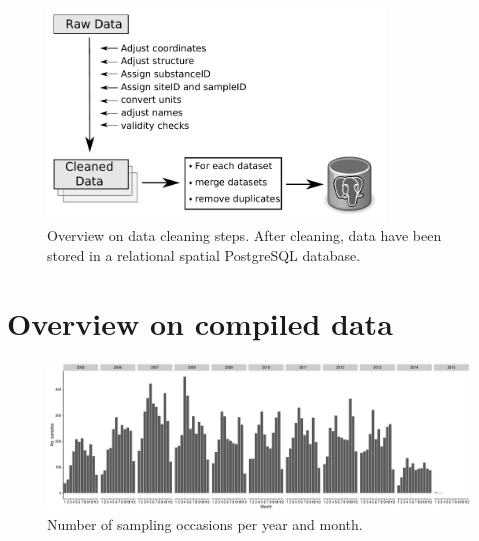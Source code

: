 \documentclass[pdftex,
	a4paper,
	titlepage=false]{scrreprt}
\begin{document}
\begin{figure}[ht]
	\centering
	\includegraphics[width = 0.8\textwidth]{data_cleaning}
	\caption[Overview on data cleaning steps.]{Overview on data cleaning steps. After cleaning, data have been stored in a relational spatial PostgreSQL database.}
	\label{fig:data_cleaning}
\end{figure}



\chapter{Overview on compiled data}


\begin{figure}[ht]
	\centering
	\includegraphics[width = \textwidth]{temporal}
	\caption{Number of sampling occasions per year and month.}
	\label{fig:temporal}
\end{figure}
\end{document}
